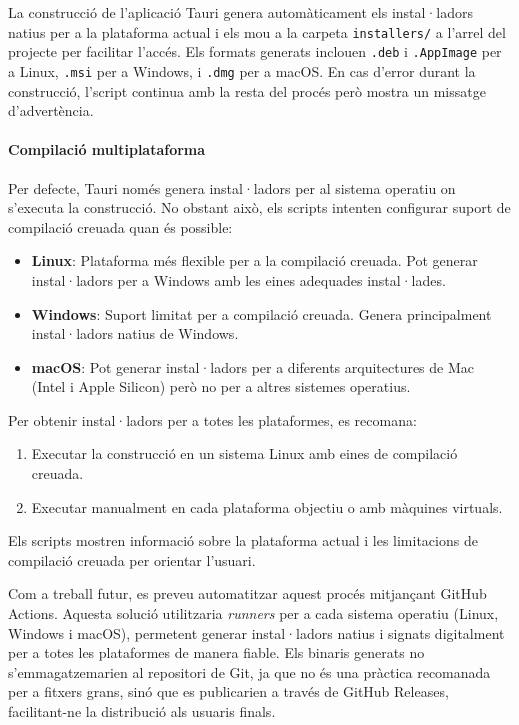 La construcció de l'aplicació Tauri genera automàticament els instal·ladors natius per a la plataforma actual i els mou a la carpeta \texttt{installers/} a l'arrel del projecte per facilitar l'accés. Els formats generats inclouen \texttt{.deb} i \texttt{.AppImage} per a Linux, \texttt{.msi} per a Windows, i \texttt{.dmg} per a macOS. En cas d'error durant la construcció, l'script continua amb la resta del procés però mostra un missatge d'advertència.

\paragraph{Compilació multiplataforma}

Per defecte, Tauri només genera instal·ladors per al sistema operatiu on s'executa la construcció. No obstant això, els scripts intenten configurar suport de compilació creuada quan és possible:

\begin{itemize}
  \item \textbf{Linux}: Plataforma més flexible per a la compilació creuada. Pot generar instal·ladors per a Windows amb les eines adequades instal·lades.
  \item \textbf{Windows}: Suport limitat per a compilació creuada. Genera principalment instal·ladors natius de Windows.
  \item \textbf{macOS}: Pot generar instal·ladors per a diferents arquitectures de Mac (Intel i Apple Silicon) però no per a altres sistemes operatius.
\end{itemize}

Per obtenir instal·ladors per a totes les plataformes, es recomana:
\begin{enumerate}
  \item Executar la construcció en un sistema Linux amb eines de compilació creuada.
  \item Executar manualment en cada plataforma objectiu o amb màquines virtuals.
\end{enumerate}

Els scripts mostren informació sobre la plataforma actual i les limitacions de compilació creuada per orientar l'usuari.

Com a treball futur, es preveu automatitzar aquest procés mitjançant GitHub Actions. Aquesta solució utilitzaria \textit{runners} per a cada sistema operatiu (Linux, Windows i macOS), permetent generar instal·ladors natius i signats digitalment per a totes les plataformes de manera fiable. Els binaris generats no s'emmagatzemarien al repositori de Git, ja que no és una pràctica recomanada per a fitxers grans, sinó que es publicarien a través de GitHub Releases, facilitant-ne la distribució als usuaris finals.


